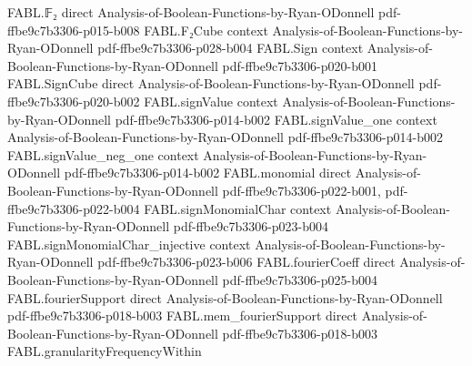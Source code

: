 \begin{theorem}
\label{FABL.oddWeightPartialSumPCPPSystem_isPCPP}
\leanok
{}
\proofstep
  {FABL.𝔽₂}
  {direct}
  {Analysis-of-Boolean-Functions-by-Ryan-ODonnell}
  {pdf-ffbe9c7b3306-p015-b008}
\proofstep
  {FABL.F₂Cube}
  {context}
  {Analysis-of-Boolean-Functions-by-Ryan-ODonnell}
  {pdf-ffbe9c7b3306-p028-b004}
\proofstep
  {FABL.Sign}
  {context}
  {Analysis-of-Boolean-Functions-by-Ryan-ODonnell}
  {pdf-ffbe9c7b3306-p020-b001}
\proofstep
  {FABL.SignCube}
  {direct}
  {Analysis-of-Boolean-Functions-by-Ryan-ODonnell}
  {pdf-ffbe9c7b3306-p020-b002}
\proofstep
  {FABL.signValue}
  {context}
  {Analysis-of-Boolean-Functions-by-Ryan-ODonnell}
  {pdf-ffbe9c7b3306-p014-b002}
\proofstep
  {FABL.signValue_one}
  {context}
  {Analysis-of-Boolean-Functions-by-Ryan-ODonnell}
  {pdf-ffbe9c7b3306-p014-b002}
\proofstep
  {FABL.signValue_neg_one}
  {context}
  {Analysis-of-Boolean-Functions-by-Ryan-ODonnell}
  {pdf-ffbe9c7b3306-p014-b002}
\proofstep
  {FABL.monomial}
  {direct}
  {Analysis-of-Boolean-Functions-by-Ryan-ODonnell}
  {pdf-ffbe9c7b3306-p022-b001,
    pdf-ffbe9c7b3306-p022-b004}
\proofstep
  {FABL.signMonomialChar}
  {context}
  {Analysis-of-Boolean-Functions-by-Ryan-ODonnell}
  {pdf-ffbe9c7b3306-p023-b004}
\proofstep
  {FABL.signMonomialChar_injective}
  {context}
  {Analysis-of-Boolean-Functions-by-Ryan-ODonnell}
  {pdf-ffbe9c7b3306-p023-b006}
\proofstep
  {FABL.fourierCoeff}
  {direct}
  {Analysis-of-Boolean-Functions-by-Ryan-ODonnell}
  {pdf-ffbe9c7b3306-p025-b004}
\proofstep
  {FABL.fourierSupport}
  {direct}
  {Analysis-of-Boolean-Functions-by-Ryan-ODonnell}
  {pdf-ffbe9c7b3306-p018-b003}
\proofstep
  {FABL.mem_fourierSupport}
  {direct}
  {Analysis-of-Boolean-Functions-by-Ryan-ODonnell}
  {pdf-ffbe9c7b3306-p018-b003}
\proofstep
  {FABL.granularityFrequencyWithin}

\end{theorem}
